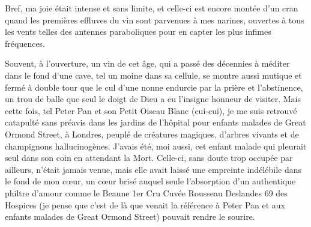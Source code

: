 Bref, ma joie était intense et sans limite, et celle-ci est encore montée d’un cran quand les premières effluves du vin sont parvenues à mes narines, ouvertes à tous les vents telles des antennes paraboliques pour en capter les plus infimes fréquences.

Souvent, à l’ouverture, un vin de cet âge, qui a passé des décennies à méditer dans le fond d’une cave, tel un moine dans sa cellule, se montre aussi mutique et fermé à double tour que le cul d’une nonne endurcie par la prière et l’abstinence, un trou de balle que seul le doigt de Dieu a eu l’insigne honneur de visiter. Mais cette fois, tel Peter Pan et son Petit Oiseau Blanc (cui-cui), je me suis retrouvé catapulté sans préavis dans les jardins de l’hôpital pour enfants malades de Great Ormond Street, à Londres, peuplé de créatures magiques, d’arbres vivants et de champignons hallucinogènes. J’avais été, moi aussi, cet enfant malade qui pleurait seul dans son coin en attendant la Mort. Celle-ci, sans doute trop occupée par ailleurs, n’était jamais venue, mais elle avait laissé une empreinte indélébile dans le fond de mon cœur, un cœur brisé auquel seule l’absorption d’un authentique philtre d’amour comme le Beaune 1er Cru Cuvée Rousseau Deslandes 69 des Hospices (je pense que c’est de là que venait la référence à Peter Pan et aux enfants malades de Great Ormond Street) pouvait rendre le sourire.


